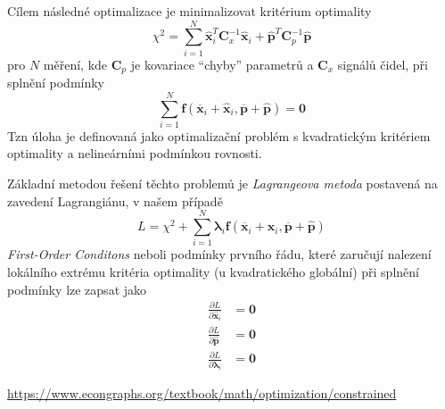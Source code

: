 \documentclass{article}
\begin{document}
	Cílem následné optimalizace je minimalizovat kritérium optimality
	\begin{equation}
		\chi^2 = \sum_{i=1}^N \bm{\hat{x}}_i^T \bm{C}_x^{-1} \bm{\hat{x}}_i + \bm{\hat{p}}^T \bm{C}_p^{-1} \bm{\hat{p}} 
	\end{equation}
	pro $N$ měření, kde $\bm{C}_p$ je kovariace ``chyby'' parametrů a $\bm{C}_x$ signálů čidel, při splnění podmínky
	\begin{equation}
		\sum_{i=1}^N \bm{f}(\bm{\overline{x}}_i+\bm{\hat{x}}_i,\bm{\overline{p}}+\bm{\hat{p}}) = \bm{0}
	\end{equation}
	Tzn úloha je definovaná jako optimalizační problém s kvadratickým kritériem optimality a nelineárními podmínkou rovnosti.

	Základní metodou řešení těchto problemů je \emph{Lagrangeova metoda} postavená na zavedení Lagrangiánu, v našem případě
	\begin{equation}
		L = \chi^2 + \sum_{i=1}^N \bm{\lambda}_i \bm{f}(\bm{\overline{x}}_i+\bm{\hat{x}}_i,\bm{\overline{p}}+\bm{\hat{p}})
	\end{equation}
	\emph{First-Order Conditons} neboli podmínky prvního řádu, které zaručují nalezení lokálního extrému kritéria optimality (u kvadratického globální) při splnění podmínky lze zapsat jako
	\begin{align}
		\frac{\partial L}{\partial \bm{\hat{x}}_i} &= \bm{0} \\
		\frac{\partial L}{\partial \bm{\hat{p}}} &= \bm{0} \\
		\frac{\partial L}{\partial \bm{\lambda}_i} &= \bm{0}
	\end{align}

	\url{https://www.econgraphs.org/textbook/math/optimization/constrained}
	
\end{document}
